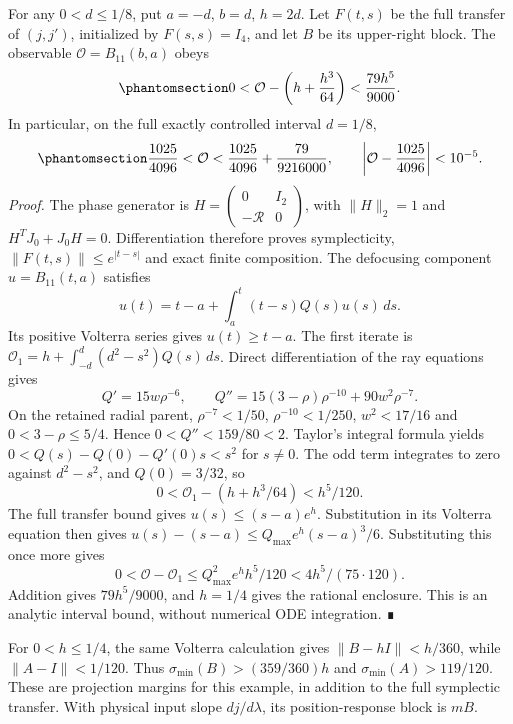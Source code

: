 \documentclass[
  english,
  11pt,
  reqno]{amsart}
\begin{document}
For any \(0<d\le1/8\), put \(a=-d\), \(b=d\), \(h=2d\). Let \(F(t,s)\)
be the full transfer of \((j,j')\), initialized by \(F(s,s)=I_4\), and
let \(B\) be its upper-right block. The observable
\(\mathcal O=B_{11}(b,a)\) obeys
\begin{equation}\protect\phantomsection\label{eq:sch-r1-rational-general}{
 0<\mathcal O-\left(h+\frac{h^3}{64}\right)<\frac{79h^5}{9000}.
}\end{equation} In particular, on the full exactly controlled interval
\(d=1/8\),
\begin{equation}\protect\phantomsection\label{eq:sch-r1-rational-enclosure}{
 \frac{1025}{4096}<\mathcal O<\frac{1025}{4096}+\frac{79}{9216000},
 \qquad \left|\mathcal O-\frac{1025}{4096}\right|<10^{-5}.
}\end{equation} \emph{Proof.} The phase generator is
\(H=\left(\begin{smallmatrix}0&I_2\\-\mathcal R&0\end{smallmatrix}\right)\),
with \(\|H\|_2=1\) and \(H^TJ_0+J_0H=0\). Differentiation therefore
proves symplecticity, \(\|F(t,s)\|\le e^{|t-s|}\) and exact finite
composition. The defocusing component \(u=B_{11}(t,a)\) satisfies \[
 u(t)=t-a+\int_a^t(t-s)Q(s)u(s)\,ds.
\] Its positive Volterra series gives \(u(t)\ge t-a\). The first iterate
is \(\mathcal O_1=h+\int_{-d}^d(d^2-s^2)Q(s)\,ds\). Direct
differentiation of the ray equations gives \[
 Q'=15w\rho^{-6},\qquad
 Q''=15(3-\rho)\rho^{-10}+90w^2\rho^{-7}.
\] On the retained radial parent, \(\rho^{-7}<1/50\),
\(\rho^{-10}<1/250\), \(w^2<17/16\) and \(0<3-\rho\le5/4\). Hence
\(0<Q''<159/80<2\). Taylor's integral formula yields
\(0<Q(s)-Q(0)-Q'(0)s<s^2\) for \(s\ne0\). The odd term integrates to
zero against \(d^2-s^2\), and \(Q(0)=3/32\), so \[
 0<\mathcal O_1-\left(h+h^3/64\right)<h^5/120.
\] The full transfer bound gives \(u(s)\le(s-a)e^h\). Substitution in
its Volterra equation then gives \(u(s)-(s-a)\le Q_{\max}e^h(s-a)^3/6\).
Substituting this once more gives \[
 0<\mathcal O-\mathcal O_1
 \le Q_{\max}^2 e^h h^5/120<4h^5/(75\cdot120).
\] Addition gives \(79h^5/9000\), and \(h=1/4\) gives the rational
enclosure. This is an analytic interval bound, without numerical ODE
integration. ∎

For \(0<h\le1/4\), the same Volterra calculation gives
\(\|B-hI\|<h/360\), while \(\|A-I\|<1/120\). Thus
\(\sigma_{\min}(B)>(359/360)h\) and \(\sigma_{\min}(A)>119/120\). These
are projection margins for this example, in addition to the full
symplectic transfer. With physical input slope \(dj/d\lambda\), its
position-response block is \(mB\).
\end{document}
